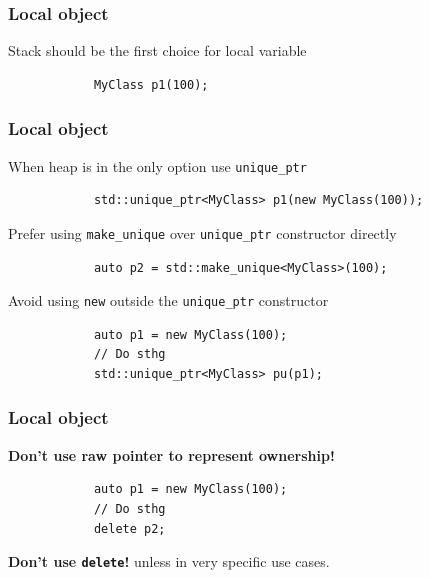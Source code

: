 \documentclass{beamer}
\begin{document}
\begin{frame}[fragile]
\frametitle{Local object}
    Stack should be the first choice for local variable
	\begin{example}
		\begin{lstlisting}
			MyClass p1(100);
		\end{lstlisting}
	\end{example}
\end{frame}

\begin{frame}[fragile]
\frametitle{Local object}
	When heap is in the only option use \texttt{unique\_ptr}
	\begin{example}
		\begin{lstlisting}
			std::unique_ptr<MyClass> p1(new MyClass(100));
		\end{lstlisting}
	\end{example}
	\pause
	Prefer using \texttt{make\_unique} over \texttt{unique\_ptr} constructor
	 directly
	\begin{example}
		\begin{lstlisting}
			auto p2 = std::make_unique<MyClass>(100);
		\end{lstlisting}
	\end{example}
	\pause		
	Avoid using \texttt{new} outside the \texttt{unique\_ptr} constructor
	\begin{example}
		\begin{lstlisting}
			auto p1 = new MyClass(100);
			// Do sthg
			std::unique_ptr<MyClass> pu(p1);
		\end{lstlisting}
	\end{example}
\end{frame}

\begin{frame}[fragile]
\frametitle{Local object}
	\textbf{Don't use raw pointer to represent ownership!}
	\begin{example}
		\begin{lstlisting}
			auto p1 = new MyClass(100);
			// Do sthg
			delete p2;
		\end{lstlisting}
	\end{example}
	\pause
	\textbf{Don't use \texttt{delete}!} unless in very specific use cases.
\end{frame}
\end{document}
